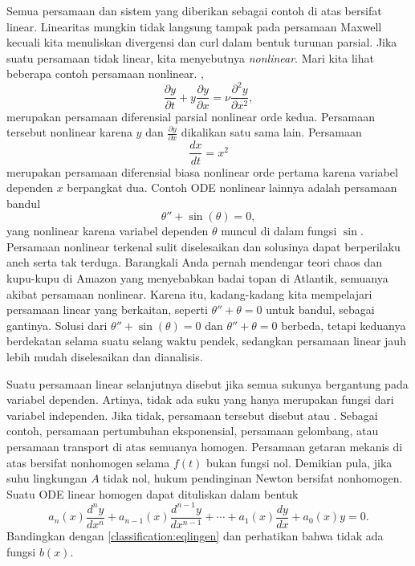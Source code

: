 Semua persamaan dan sistem yang diberikan sebagai contoh di atas bersifat linear.
Linearitas mungkin tidak langsung tampak pada persamaan Maxwell kecuali kita
menuliskan divergensi dan curl dalam bentuk turunan parsial.
Jika suatu persamaan tidak linear, kita menyebutnya
\emph{nonlinear}.
Mari kita lihat beberapa contoh persamaan nonlinear. ,
\begin{equation*}
\frac{\partial y}{\partial t} +
y \frac{\partial y}{\partial x} =
\nu \frac{\partial^2 y}{\partial x^2} ,
\end{equation*}
merupakan persamaan diferensial parsial nonlinear orde kedua. Persamaan tersebut
nonlinear karena $y$ dan $\frac{\partial y}{\partial x}$ dikalikan satu sama lain.
Persamaan
\begin{equation} \label{classification:eqnonlinode}
\frac{dx}{dt} = x^2
\end{equation}
merupakan persamaan diferensial biasa nonlinear orde pertama karena variabel
dependen $x$ berpangkat dua. Contoh ODE nonlinear lainnya adalah persamaan bandul
\begin{equation} \label{classification:pendulum}
\theta''+\sin(\theta)=0 ,
\end{equation}
yang nonlinear karena variabel dependen $\theta$ muncul di dalam fungsi $\sin$.
Persamaan nonlinear terkenal sulit diselesaikan dan solusinya dapat berperilaku
aneh serta tak terduga. Barangkali Anda pernah mendengar teori chaos dan kupu-kupu
di Amazon yang menyebabkan badai topan di Atlantik, semuanya akibat persamaan nonlinear.
Karena itu, kadang-kadang kita mempelajari persamaan linear yang berkaitan,
seperti $\theta''+\theta=0$ untuk bandul, sebagai gantinya.
Solusi dari $\theta''+\sin(\theta) = 0$ dan
$\theta''+\theta=0$ berbeda, tetapi keduanya berdekatan selama suatu selang waktu
pendek, sedangkan persamaan linear jauh lebih mudah diselesaikan dan dianalisis.

\medskip

Suatu persamaan linear selanjutnya disebut \emph{} jika
semua sukunya bergantung pada variabel dependen. Artinya, tidak ada suku yang
hanya merupakan fungsi dari variabel independen. Jika tidak, persamaan tersebut
disebut \emph{} atau
\emph{}. Sebagai contoh,
persamaan pertumbuhan eksponensial, persamaan gelombang, atau persamaan transport
di atas semuanya homogen. Persamaan getaran mekanis di atas bersifat nonhomogen
selama $f(t)$ bukan fungsi nol. Demikian pula, jika suhu lingkungan $A$ tidak nol,
hukum pendinginan Newton bersifat nonhomogen.
Suatu ODE linear homogen dapat dituliskan dalam bentuk
\begin{equation*}
a_n(x) \frac{d^n y}{dx^n} +
a_{n-1}(x) \frac{d^{n-1} y}{dx^{n-1}} +
\cdots
+
a_{1}(x) \frac{dy}{dx}
+
a_{0}(x) y = 0 .
\end{equation*}
Bandingkan dengan \eqref{classification:eqlingen} dan perhatikan bahwa tidak ada
fungsi $b(x)$.

